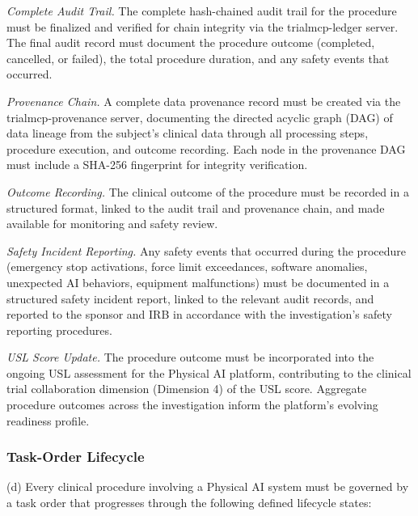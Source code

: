 \documentclass[11pt]{article}
\begin{document}
\begin{description}[leftmargin=1.0cm,style=sameline]
\item[(1)] \textit{Complete Audit Trail.} The complete hash-chained audit trail for the procedure must be finalized and verified for chain integrity via the trialmcp-ledger server. The final audit record must document the procedure outcome (completed, cancelled, or failed), the total procedure duration, and any safety events that occurred.
\item[(2)] \textit{Provenance Chain.} A complete data provenance record must be created via the trialmcp-provenance server, documenting the directed acyclic graph (DAG) of data lineage from the subject's clinical data through all processing steps, procedure execution, and outcome recording. Each node in the provenance DAG must include a SHA-256 fingerprint for integrity verification.
\item[(3)] \textit{Outcome Recording.} The clinical outcome of the procedure must be recorded in a structured format, linked to the audit trail and provenance chain, and made available for monitoring and safety review.
\item[(4)] \textit{Safety Incident Reporting.} Any safety events that occurred during the procedure (emergency stop activations, force limit exceedances, software anomalies, unexpected AI behaviors, equipment malfunctions) must be documented in a structured safety incident report, linked to the relevant audit records, and reported to the sponsor and IRB in accordance with the investigation's safety reporting procedures.
\item[(5)] \textit{USL Score Update.} The procedure outcome must be incorporated into the ongoing USL assessment for the Physical AI platform, contributing to the clinical trial collaboration dimension (Dimension 4) of the USL score. Aggregate procedure outcomes across the investigation inform the platform's evolving readiness profile.
\end{description}

\subsubsection{Task-Order Lifecycle}

(d) Every clinical procedure involving a Physical AI system must be governed by a task order that progresses through the following defined lifecycle states:
\end{document}
